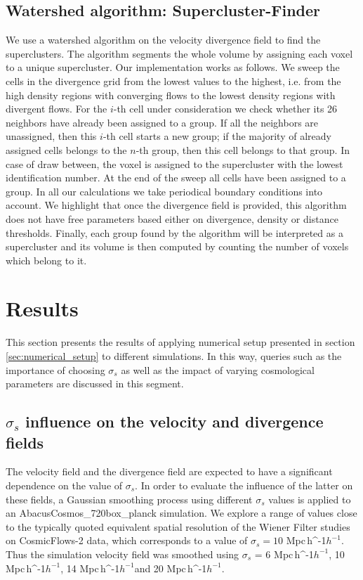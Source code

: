 \documentclass[usenatbib]{mnras}
\newcommand{\Mpch}{\,{\rm Mpc}\,\ifmmode h^{-1}\else $h^{-1}$\fi}
\begin{document}
\subsection{Watershed algorithm: Supercluster-Finder}

We use a watershed algorithm \citep{BeucherWatershed1979} on the velocity divergence field to find the
superclusters.
The algorithm segments the whole volume by assigning each voxel to a unique supercluster. 
Our implementation works as follows. 
We sweep the cells in the divergence grid from the lowest values to the highest, i.e. from
the high density regions with converging flows to the lowest density regions with divergent
flows.
For the $i$-th cell under consideration we check whether its 26 neighbors have already been assigned to a group. 
If all the neighbors are unassigned, then this $i$-th cell starts a
new group; if the majority of already assigned cells belongs to the
$n$-th group, then this cell belongs to that group.
In case of draw between, the voxel is assigned to the supercluster with the lowest identification number.
At the end of the sweep all cells have been assigned to a group. 
In all our calculations we take periodical boundary conditions into
account.  
We highlight that once the divergence field is provided, this algorithm
does not have free parameters based either on divergence, density or distance thresholds. 
Finally, each group found by the algorithm will be interpreted as a supercluster and its volume is then computed by counting the number of voxels which belong to it.


\section{Results}
This section presents the results of applying numerical setup presented in section \ref{sec:numerical_setup} to different simulations. In this way, queries such as the importance of choosing $\sigma_s$ as well as the impact of varying cosmological parameters are discussed in this segment.

\subsection{$\sigma_s$ influence on the velocity and divergence fields}
\label{VDF effects}

The velocity field and the divergence field are expected to have a significant dependence on the value of $\sigma_s$. In order to evaluate the influence of the latter on these fields, a Gaussian smoothing process using different $\sigma_s$ values is applied to an AbacusCosmos\_720box\_planck simulation.
We explore a range of values close to the typically quoted equivalent
spatial resolution of the Wiener Filter studies on
CosmicFlows-2 data, which corresponds to a value of $\sigma_s = 10$\,\Mpch.
Thus the simulation velocity field was smoothed using $\sigma_s$ = 6\,\Mpch, 10\,\Mpch, 14\,\Mpch and 20\,\Mpch. 
\end{document}
